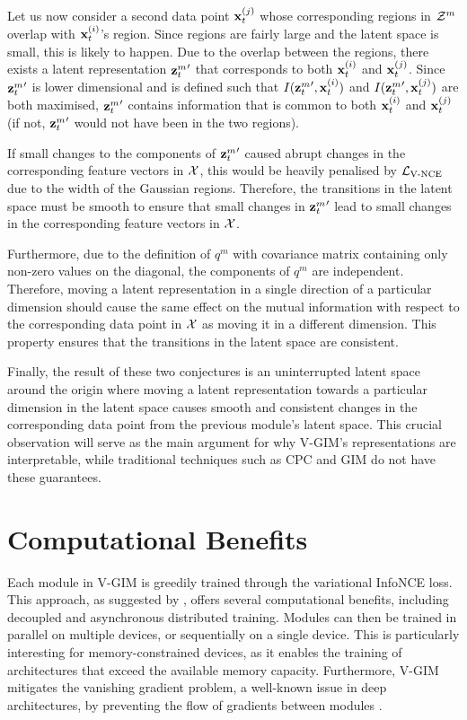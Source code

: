			Let us now consider a second data point $\mathbf{x}_t^{(j)}$ whose corresponding regions in $\mathcal{Z}^m$ overlap with $\mathbf{x}_t^{(i)}$'s region. Since regions are fairly large and the latent space is small, this is likely to happen. Due to the overlap between the regions, there exists a latent representation ${\mathbf{z}_t^{m}}'$ that corresponds to both $\mathbf{x}_t^{(i)}$ and $\mathbf{x}_t^{(j)}$. 
			Since ${\mathbf{z}_t^{m}}'$ is lower dimensional and is defined such that $I({\mathbf{z}_t^{m}}', \mathbf{x}_t^{(i)})$ and $I({\mathbf{z}_t^{m}}', \mathbf{x}_t^{(j)})$ are both maximised, ${\mathbf{z}_t^{m}}'$ contains information that is common to both $\mathbf{x}_t^{(i)}$ and $\mathbf{x}_t^{(j)}$ (if not, ${\mathbf{z}_t^{m}}'$ would not have been in the two regions).
			
			If small changes to the components of ${\mathbf{z}_t^{m}}'$ caused abrupt changes in the corresponding feature vectors in $\mathcal{X}$, this would be heavily penalised by $\mathcal{L}_{\text{V-NCE}}$ due to the width of the Gaussian regions. Therefore, the transitions in the latent space must be smooth to ensure that small changes in ${\mathbf{z}_t^{m}}'$ lead to small changes in the corresponding feature vectors in $\mathcal{X}$.
			
			Furthermore, due to the definition of $q^m$ with covariance matrix containing only non-zero values on the diagonal, the components of $q^m$ are independent. Therefore, moving a latent representation in a single direction of a particular dimension should cause the same effect on the mutual information with respect to the corresponding data point in $\mathcal{X}$ as moving it in a different dimension. This property ensures that the transitions in the latent space are consistent.
							
			Finally, the result of these two conjectures is an uninterrupted latent space around the origin 
			where moving a latent representation towards a particular dimension in the latent space causes smooth and consistent changes in the corresponding data point from the previous module's latent space. This crucial observation will serve as the main argument for why V-GIM's representations are interpretable, while traditional techniques such as CPC and GIM do not have these guarantees. 
		
		
			


		
\section{Computational Benefits} \label{cha:vgim_benefits}
	Each module in V-GIM is greedily trained through the variational InfoNCE loss. This approach, as suggested by \cite{lowePuttingEndEndtoEnd2020a}, offers several computational benefits, including decoupled and asynchronous distributed training. Modules can then be trained in parallel on multiple devices, or sequentially on a single device. This is particularly interesting for memory-constrained devices, 
	as it enables the training of architectures that exceed the available memory capacity. Furthermore, V-GIM mitigates the vanishing gradient problem, a well-known issue in deep architectures, by preventing the flow of gradients between modules \citep{huHandlingVanishingGradient2021}.
	
